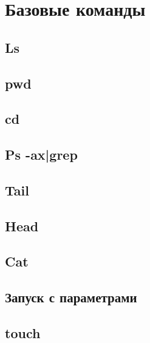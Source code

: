 \section{Базовые команды}
\subsection{Ls}
\subsection{pwd}
\subsection{cd}
\subsection{Ps -ax|grep}
\subsection{Tail}
\subsection{Head}
\subsection{Cat}
\subsection{Запуск с параметрами}
\subsection{touch}
\newpage
